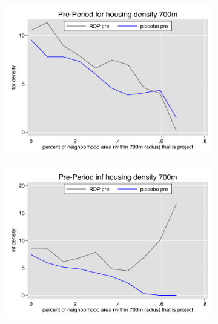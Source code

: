 \documentclass[12pt]{article}
\begin{document}
\begin{figure}
        \begin{subfigure}[b]{0.495\textwidth}
            \centering
            \includegraphics[width=\textwidth,trim={0.3cm .3cm 0.1cm 0cm}, clip=true]{figures/overlap_for_700_local_pre.pdf}
        \end{subfigure}
        \hfill
        \begin{subfigure}[b]{0.495\textwidth}  
            \centering 
            \includegraphics[width=\textwidth,trim={0.3cm .3cm 0.1cm 0cm}, clip=true]{figures/overlap_inf_700_local_pre.pdf}
        \end{subfigure}
        \vspace{-6mm}

\end{figure}
\end{document}
